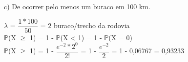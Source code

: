 \documentclass[12pt,a4paper]{article}
\begin{document}
	c) De ocorrer pelo menos um buraco em 100 km.
	\begin{center}
		\vspace{0.5cm}
		$\lambda$ = $\dfrac{1 * 100}{50}$ = 2 buraco/trecho da rodovia
		\vspace{1cm}\\
		$\mathbb{P}$(X $\geq$ 1) = 1 - $\mathbb{P}$(X < 1) = 1 - $\mathbb{P}$(X = 0)
		\vspace{1cm}\\
		$\mathbb{P}$(X $\geq$ 1) = 1 - $\dfrac{e^{-2} * 2^0}{2!}$ = 1 - $\dfrac{e^{-2}}{2}$ = 1 - 0,06767 = 0,93233
	\end{center}
\end{document}
